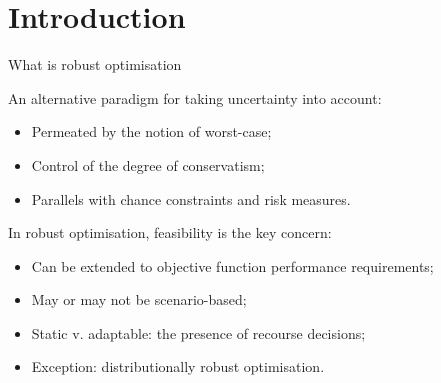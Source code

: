 \section{Introduction}


\begin{frame}{What is robust optimisation}

	An alternative paradigm for taking uncertainty into account:
	\begin{itemize}
		\item Permeated by the notion of \alert{worst-case};
		\item Control of the degree of \alert{conservatism};	
		\item Parallels with \alert{chance constraints} and \alert{risk measures}.
	\end{itemize}
	
	\pause
	In robust optimisation, \alert{feasibility} is the key concern:
	\begin{itemize}
		\item Can be extended to objective function performance requirements;
		\item May or may not be \alert{scenario-based};
		\item Static v. adaptable: the presence of \alert{recourse decisions};
		\item Exception: distributionally robust optimisation.	
	\end{itemize}
	
\end{frame}


